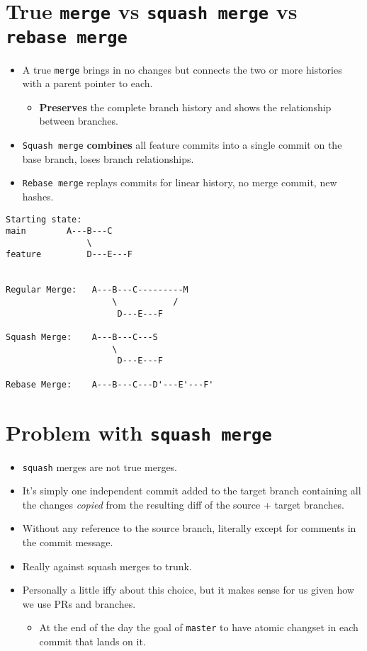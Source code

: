\documentclass[11pt]{article}
\begin{document}
\section{True \texttt{merge} vs \texttt{squash merge} vs \texttt{rebase merge}}
\label{sec:org5776794}
\begin{itemize}
\item A true \texttt{merge} brings in no changes but connects the two or more histories with a parent pointer to each.
\begin{itemize}
\item \textbf{Preserves} the complete branch history and shows the relationship between branches.
\end{itemize}
\item \texttt{Squash merge} \textbf{combines} all feature commits into a single commit on the base branch, loses branch relationships.
\item \texttt{Rebase merge} replays commits for linear history, no merge commit, new hashes.
\end{itemize}
\begin{verbatim}
Starting state:
main        A---B---C
                \
feature         D---E---F


Regular Merge:   A---B---C---------M
                     \           /
                      D---E---F

Squash Merge:    A---B---C---S
                     \
                      D---E---F

Rebase Merge:    A---B---C---D'---E'---F'
\end{verbatim}
\section{Problem with \texttt{squash merge}}
\label{sec:orge85476f}
\begin{itemize}
\item \texttt{squash} merges are not true merges.
\item It's simply one independent commit added to the target branch containing all the changes \emph{copied} from the resulting diff of the source + target branches.
\item Without any reference to the source branch, literally except for comments in the commit message.
\item Really against squash merges to trunk.
\item Personally a little iffy about this choice, but it makes sense for us given how we use PRs and branches.
\begin{itemize}
\item At the end of the day the goal of \texttt{master} to have atomic changset in each commit that lands on it.
\end{itemize}
\end{itemize}
\end{document}
